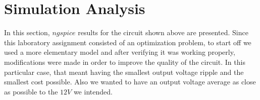 \section{Simulation Analysis}
\label{sec:simulation}

In this section, $ngspice$ results for the circuit shown above are presented. Since this laboratory assignment consisted of an optimization problem, to start off we used a more elementary model and after verifying it was working properly, modifications were made in order to improve the quality of the circuit. In this particular case, that meant having the smallest output voltage ripple and the smallest cost possible. Also we wanted to have an output voltage average as close as possible to the $12 V$ we intended.
